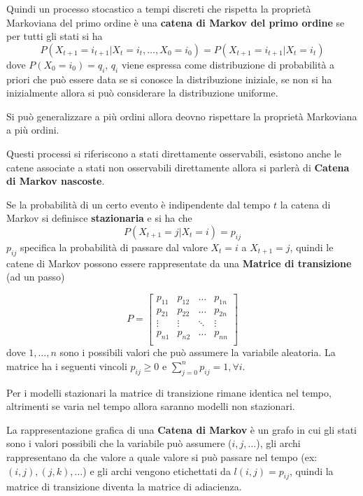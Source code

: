 Quindi un processo stocastico a tempi discreti che rispetta la proprietà Markoviana 
del primo ordine è una \textbf{catena di Markov del primo ordine} se per tutti gli stati si ha 
$$P(X_{t+1} = i_{t+1 } | X_t =i_t, \dots, X_{0} = i_{0}) = P(X_{t+1} = i_{t+1 } | X_t =i_t)$$
dove $P(X_0 = i_0) = q_i$, $q_i$ viene espressa come distribuzione di probabilità 
a priori che può essere data se si conosce la distribuzione iniziale, se non si 
ha inizialmente allora si può considerare la distribuzione uniforme. 

\begin{nota}
    Si può generalizzare a più ordini allora deovno rispettare 
    la proprietà Markoviana a più ordini.     
\end{nota}

Questi processi si riferiscono a stati direttamente osservabili, esistono anche 
le catene associate a stati non osservabili direttamente allora si parlerà di 
\textbf{Catena di Markov nascoste}.

Se la probabilità di un certo evento è indipendente dal tempo $t$ la catena di 
Markov si definisce \textbf{stazionaria} e si ha che 
$$P(X_{t+1}=j | X_t = i) = p_{ij}$$
$p_{ij}$  specifica la probabilità di passare dal valore $X_t = i$ a $X_{t+1} = j$,
quindi le catene di Markov possono essere rappresentate da una \textbf{Matrice di 
transizione} (ad un passo)

$$ P = \left[\begin{array}{cccc}
    p_{11} & p_{12} & \dots & p_{1n}\\
    p_{21} & p_{22} & \dots & p_{2n}\\
    \vdots & \vdots & \ddots & \vdots\\
    p_{n1} & p_{n2} & \dots & p_{nn}\\
\end{array}\right]$$
dove $1,\dots, n$ sono i possibili valori che può assumere la variabile aleatoria.
La matrice ha i seguenti vincoli $p_{ij}\ge 0$ e $\sum_{j=0}^{n}p_{ij}=1, \forall i$.

\begin{nota}
    Per i modelli stazionari la matrice di transizione rimane identica nel tempo, 
    altrimenti se varia nel tempo allora saranno modelli non stazionari.
\end{nota}

La rappresentazione grafica di una \textbf{Catena di Markov} è un grafo in cui 
gli stati sono i valori possibili che la variabile può assumere ($i,j,\dots$), gli archi rappresentano 
da che valore a quale valore si può passare nel tempo (ex: $(i,j), (j,k),\dots$) e gli archi vengono etichettati 
da $l(i,j) = p_{ij}$, quindi la matrice di transizione diventa la matrice di 
adiacienza.

